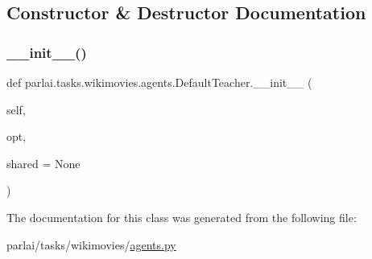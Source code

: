 \subsection{Constructor \& Destructor Documentation}
\mbox{\label{classparlai_1_1tasks_1_1wikimovies_1_1agents_1_1DefaultTeacher_a4bef6f1b4e0fff6a37c8ec1441cd9e6c}} 
\subsubsection{\texorpdfstring{\+\_\+\+\_\+init\+\_\+\+\_\+()}{\_\_init\_\_()}}
{\footnotesize\ttfamily def parlai.\+tasks.\+wikimovies.\+agents.\+Default\+Teacher.\+\_\+\+\_\+init\+\_\+\+\_\+ (\begin{DoxyParamCaption}\item[{}]{self,  }\item[{}]{opt,  }\item[{}]{shared = {\ttfamily None} }\end{DoxyParamCaption})}



The documentation for this class was generated from the following file\+:\begin{DoxyCompactItemize}
\item 
parlai/tasks/wikimovies/\hyperlink{parlai_2tasks_2wikimovies_2agents_8py}{agents.\+py}\end{DoxyCompactItemize}
